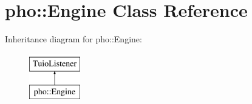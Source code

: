 \hypertarget{classpho_1_1Engine}{\section{pho\-:\-:Engine Class Reference}
\label{classpho_1_1Engine}
}
Inheritance diagram for pho\-:\-:Engine\-:\begin{figure}[H]
\begin{center}
\leavevmode
\includegraphics[height=2.000000cm]{classpho_1_1Engine}
\end{center}
\end{figure}
